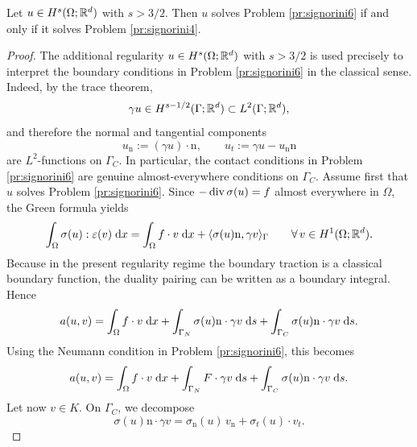 \begin{proposition}
	Let $u\in H^s(\Omega;{\mathbb R}^d)$ with $s>3/2$. Then $u$ solves Problem \ref{pr:signorini6} if and only if it solves Problem \ref{pr:signorini4}.
\end{proposition}
\begin{proof}
	The additional regularity $u\in H^s(\Omega;{\mathbb R}^d)$ with $s>3/2$ is used precisely to interpret the boundary conditions in Problem \ref{pr:signorini6} in the classical sense. Indeed, by the trace theorem,
	\begin{equation*}
		\gamma u\in H^{s-1/2}(\Gamma;{\mathbb R}^d)\subset L^2(\Gamma;{\mathbb R}^d),
	\end{equation*}
	and therefore the normal and tangential components
	\begin{equation*}
		u_{\mathrm n}:=(\gamma u)\cdot \mathrm n,
		\qquad
		u_t:=\gamma u-u_{\mathrm n}\mathrm n
	\end{equation*}
	are $L^2$-functions on $\Gamma_C$. In particular, the contact conditions in Problem \ref{pr:signorini6} are genuine almost-everywhere conditions on $\Gamma_C$. Assume first that $u$ solves Problem \ref{pr:signorini6}. Since $-\diver \sigma(u) = f$ almost everywhere in $\Omega$, the Green formula yields
	\begin{equation*}
		\int_\Omega \sigma(u):\varepsilon(v)\;{{\mathrm{d}} x}
		=
		\int_\Omega f\cdot v\;{{\mathrm{d}} x}
		+
		\langle \sigma(u)\mathrm n,\gamma v\rangle_\Gamma\qquad \forall\, v\in H^1(\Omega;{\mathbb R}^d).
	\end{equation*}
	Because in the present regularity regime the boundary traction is a classical boundary function, the duality pairing can be written as a boundary integral. Hence
	\begin{equation*}
		a(u,v)
		=
		\int_\Omega f\cdot v\;{{\mathrm{d}} x}
		+
		\int_{\Gamma_N} \sigma(u)\mathrm n\cdot \gamma v\;{{\mathrm{d}} s}
		+
		\int_{\Gamma_C} \sigma(u)\mathrm n\cdot \gamma v\;{{\mathrm{d}} s}.
	\end{equation*}
	Using the Neumann condition in Problem \ref{pr:signorini6}, this becomes
	\begin{equation*}
		a(u,v)
		=
		\int_\Omega f\cdot v\;{{\mathrm{d}} x}
		+
		\int_{\Gamma_N} F\cdot \gamma v\;{{\mathrm{d}} s}
		+
		\int_{\Gamma_C} \sigma(u)\mathrm n\cdot \gamma v\;{{\mathrm{d}} s}.
	\end{equation*}
	Let now $v\in K$. On $\Gamma_C$, we decompose
	\begin{equation*}
		\sigma(u)\mathrm n\cdot \gamma v
		=
		\sigma_{\mathrm n}(u)\,v_{\mathrm n}
		+
		\sigma_t(u)\cdot v_t.
	\end{equation*}

\end{proof}
